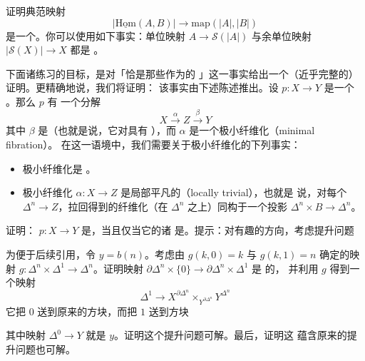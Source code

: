 \begin{exercise}\label{ex:realization-hom-homotopy-equivalence}
证明典范映射
\[
|\underline{\mathrm{Hom}}(A, B)| \longrightarrow \mathrm{map}(|A|, |B|)
\]
是一个\trHomotopyEquivalence{}。你可以使用如下事实：单位映射
$A \to \mathcal{S}(|A|)$ 与余单位映射 $|\mathcal{S}(X)| \to X$ 都是%
\trWeakEquivalence{}。
\end{exercise}

下面诸练习的目标，是对「\trAnodyneMap{}恰是那些作为\trWeakEquivalence{}的%
\trMonomorphism{}」这一事实给出一个（近乎完整的）证明。更精确地说，我们将证明：
该事实由下述陈述推出。设 $p\colon X \to Y$ 是一个 \trKanFibration{}。那么 $p$ 有
一个分解
\[
X \xrightarrow{\ \alpha\ } Z \xrightarrow{\ \beta\ } Y
\]
其中 $\beta$ 是\trTrivialFibration{}（也就是说，它对\trMonomorphism{}具有%
\trRightLiftingProperty{}），而 $\alpha$ 是一个极小纤维化（minimal fibration）。
在这一语境中，我们需要关于极小纤维化的下列事实：
\begin{itemize}
  \item 极小纤维化是 \trKanFibration{}。
  \item 极小纤维化 $\alpha\colon X \to Z$ 是局部平凡的（locally trivial），也就是
        说，对每个\trSimplex{} $\Delta^n \to Z$，拉回得到的纤维化（在 $\Delta^n$
        之上）同构于一个投影 $\Delta^n \times B \to \Delta^n$。
\end{itemize}

\begin{exercise}\label{ex:kan-fibration-contractible-fibres}
证明：\trKanFibration{} $p\colon X \to Y$ 是\trTrivialFibration{}，当且仅当它的诸%
\trFibre{}是\trContractible{}。提示：对有趣的方向，考虑提升问题
\begin{center}
\end{center}
为便于后续引用，令 $y = b(n)$。考虑由 $g(k, 0) = k$ 与 $g(k, 1) = n$ 确定的映射
$g\colon \Delta^n \times \Delta^1 \to \Delta^n$。证明映射
$\partial\Delta^n \times \{0\} \to \partial\Delta^n \times \Delta^1$ 是%
\trAnodyne{}的，
并利用 $g$ 得到一个映射
\[
\Delta^1 \to X^{\partial\Delta^n} \times_{Y^{\partial\Delta^n}} Y^{\Delta^n}
\]
它把 $0$ 送到原来的方块，而把 $1$ 送到方块
\begin{center}
\end{center}
其中映射 $\Delta^0 \to Y$ 就是\trObject{} $y$。证明这个提升问题可解。最后，证明这
蕴含原来的提升问题也可解。
\end{exercise}

